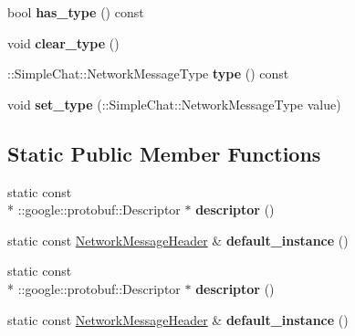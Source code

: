 \begin{DoxyCompactItemize}
\item 
\hypertarget{classSimpleChat_1_1NetworkMessageHeader_a053ce1d5b479c63b4eec557e5a329ff0}{bool {\bfseries has\-\_\-type} () const }\label{classSimpleChat_1_1NetworkMessageHeader_a053ce1d5b479c63b4eec557e5a329ff0}

\item 
\hypertarget{classSimpleChat_1_1NetworkMessageHeader_a370f33ee9694bedca599961ce3842678}{void {\bfseries clear\-\_\-type} ()}\label{classSimpleChat_1_1NetworkMessageHeader_a370f33ee9694bedca599961ce3842678}

\item 
\hypertarget{classSimpleChat_1_1NetworkMessageHeader_a2a7fcad8abb37ba1a4ffb8d2f04b20e8}{\-::Simple\-Chat\-::\-Network\-Message\-Type {\bfseries type} () const }\label{classSimpleChat_1_1NetworkMessageHeader_a2a7fcad8abb37ba1a4ffb8d2f04b20e8}

\item 
\hypertarget{classSimpleChat_1_1NetworkMessageHeader_a05389e5df449611dc1396b530cdb5f94}{void {\bfseries set\-\_\-type} (\-::Simple\-Chat\-::\-Network\-Message\-Type value)}\label{classSimpleChat_1_1NetworkMessageHeader_a05389e5df449611dc1396b530cdb5f94}

\end{DoxyCompactItemize}
\subsection*{Static Public Member Functions}
\begin{DoxyCompactItemize}
\item 
\hypertarget{classSimpleChat_1_1NetworkMessageHeader_ae2bb00ae2304c25802dd3d416af757a0}{static const \\*
\-::google\-::protobuf\-::\-Descriptor $\ast$ {\bfseries descriptor} ()}\label{classSimpleChat_1_1NetworkMessageHeader_ae2bb00ae2304c25802dd3d416af757a0}

\item 
\hypertarget{classSimpleChat_1_1NetworkMessageHeader_a1f89418000bf2c19cf7c70cdeaa9295a}{static const \hyperlink{classSimpleChat_1_1NetworkMessageHeader}{Network\-Message\-Header} \& {\bfseries default\-\_\-instance} ()}\label{classSimpleChat_1_1NetworkMessageHeader_a1f89418000bf2c19cf7c70cdeaa9295a}

\item 
\hypertarget{classSimpleChat_1_1NetworkMessageHeader_ae2bb00ae2304c25802dd3d416af757a0}{static const \\*
\-::google\-::protobuf\-::\-Descriptor $\ast$ {\bfseries descriptor} ()}\label{classSimpleChat_1_1NetworkMessageHeader_ae2bb00ae2304c25802dd3d416af757a0}

\item 
\hypertarget{classSimpleChat_1_1NetworkMessageHeader_a1f89418000bf2c19cf7c70cdeaa9295a}{static const \hyperlink{classSimpleChat_1_1NetworkMessageHeader}{Network\-Message\-Header} \& {\bfseries default\-\_\-instance} ()}\label{classSimpleChat_1_1NetworkMessageHeader_a1f89418000bf2c19cf7c70cdeaa9295a}

\end{DoxyCompactItemize}
